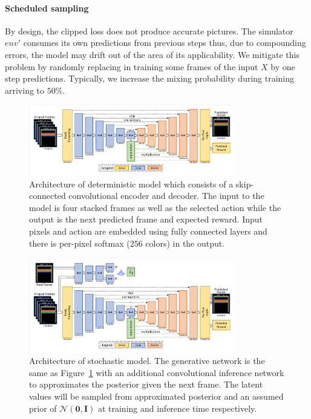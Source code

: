 \paragraph{Scheduled sampling}
By design, the clipped loss does not produce accurate pictures. The simulator $env'$ consumes its own predictions from previous steps thus, due to compounding errors, the model may drift out of the area of its applicability. We mitigate this problem by randomly replacing in training some frames of the input $X$ by one step predictions. Typically, we increase the mixing probability during training arriving to $50\%$. 

\begin{figure}[t]
\centering
\includegraphics[width=0.8\textwidth]{figures/model_basic_det.pdf}
\caption{Architecture of deterministic model which consists of a skip-connected convolutional encoder and decoder. The input to the model is four stacked frames as well as the selected action while the output is the next predicted frame and expected reward. Input pixels and action are embedded using fully connected layers and there is per-pixel softmax ($256$ colors) in the output.}
\label{fig:model_det}
\end{figure}

\begin{figure}[t]
\centering
\includegraphics[width=0.8\textwidth]{figures/model_basic_stoch.pdf}
\caption{Architecture of stochastic model. The generative network is the same as Figure~\ref{fig:model_det} with an additional convolutional inference network to approximates the posterior given the next frame. The latent values will be sampled from approximated posterior and an assumed prior of $\mathcal{N}(\mathbf{0}, \mathbf{I})$ at training and inference time respectively.}
\label{fig:model_stoch}
\end{figure}

